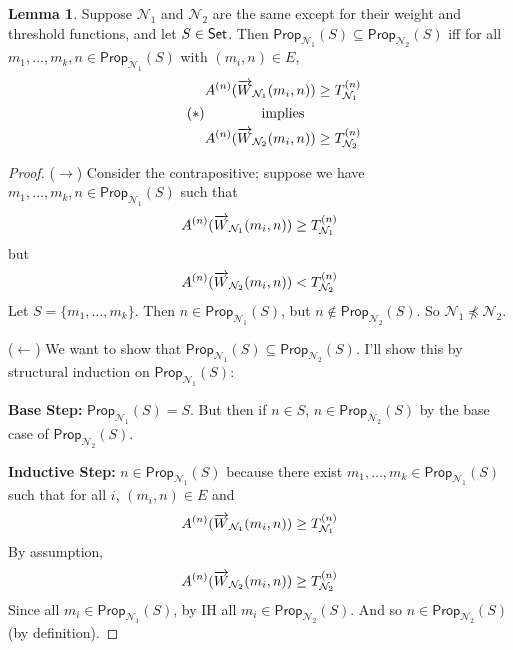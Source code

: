 \documentclass[12pt]{article}
\newcommand{\Set}{\mbox{\sf Set}}
\theoremstyle{definition}
\newtheorem{lemma}[theorem]{Lemma}
\newcommand{\set}[1]{\{ #1 \}}
\newcommand{\Prop}{\textsf{Prop}}
\newcommand{\Net}{\mathcal{N}}
\begin{document}
\begin{lemma}
\label{lemma:subnet->leq}
Suppose $\Net_1$ and $\Net_2$ are the same except for their weight and threshold functions, and let $S \in \Set$.  Then $\Prop_{\Net_1}(S) \subseteq \Prop_{\Net_2}(S)$ iff for all $m_1, \ldots, m_k, n \in \Prop_{\Net_1}(S)$ with $(m_i, n) \in E$,
\begin{equation}\tag{$\ast$}
\label{eqn:weight-condition}
  \begin{gathered}
    A^{(n)}(\smash{\overrightarrow{W}}_{\Net_1}(m_i, n)) \geq T_{\Net_1}^{(n)} \\
    \mbox{implies} \\
    A^{(n)}(\smash{\overrightarrow{W}}_{\Net_2}(m_i, n)) \geq T_{\Net_2}^{(n)}
  \end{gathered}
\end{equation}
\end{lemma}
\begin{proof}
($\rightarrow$) Consider the contrapositive; suppose we have $m_1, \ldots, m_k, n \in \Prop_{\Net_1}(S)$ such that 
\[
A^{(n)}(\smash{\overrightarrow{W}}_{\Net_1}(m_i, n)) \geq T_{\Net_1}^{(n)}
\]
but
\[
A^{(n)}(\smash{\overrightarrow{W}}_{\Net_2}(m_i, n)) < T_{\Net_2}^{(n)}
\]
Let $S = \set{m_1, \ldots, m_k}$.  Then $n \in \Prop_{\Net_1}(S)$, but $n \not \in \Prop_{\Net_2}(S)$.  So $\Net_1 \not \preceq \Net_2$.


($\leftarrow$) We want to show that $\Prop_{\Net_1}(S) \subseteq \Prop_{\Net_2}(S)$.  I'll show this by structural induction on $\Prop_{\Net_1}(S)$:

\textbf{Base Step:} $\Prop_{\Net_1}(S) = S$.  But then if $n \in S$, $n \in \Prop_{\Net_2}(S)$ by the base case of $\Prop_{\Net_2}(S)$.

\textbf{Inductive Step:}
$n \in \Prop_{\Net_1}(S)$ because there exist $m_1, \ldots, m_k \in \Prop_{\Net_1}(S)$ such that for all $i$, $(m_i, n) \in E$ and
\[
A^{(n)}(\smash{\overrightarrow{W}}_{\Net_1}(m_i, n)) \geq T_{\Net_1}^{(n)}
\]
By assumption,
\[
A^{(n)}(\smash{\overrightarrow{W}}_{\Net_2}(m_i, n)) \geq T_{\Net_2}^{(n)}
\]
Since all $m_i \in \Prop_{\Net_1}(S)$, by IH all $m_i \in \Prop_{\Net_2}(S)$.  And so $n \in \Prop_{\Net_2}(S)$ (by definition).
\end{proof}
\end{document}
